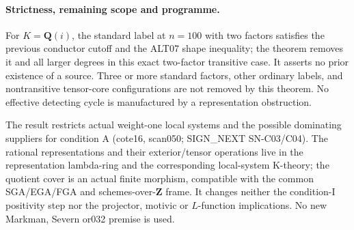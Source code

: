 \paragraph{Strictness, remaining scope and programme.}
For $K=\mathbf Q(i)$, the standard label at $n=100$ with two
factors satisfies the previous conductor cutoff and the ALT07
shape inequality; the theorem removes it and all larger degrees
in this exact two-factor transitive case. It asserts no prior
existence of a source. Three or more standard factors, other
ordinary labels, and nontransitive tensor-core configurations
are not removed by this theorem. No effective detecting cycle
is manufactured by a representation obstruction.

The result restricts actual weight-one local systems and the
possible dominating suppliers for condition A (cote16, scan050;
SIGN_NEXT SN-C03/C04). The rational representations and their
exterior/tensor operations live in the representation lambda-ring
and the corresponding local-system K-theory; the quotient cover
is an actual finite morphism, compatible with the common
SGA/EGA/FGA and schemes-over-$\mathbf Z$ frame. It changes
neither the condition-I positivity step nor the projector,
motivic or $L$-function implications. No new Markman, Severn
or032 premise is used.
